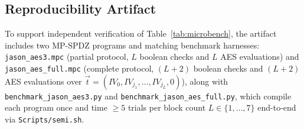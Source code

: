 \subsection{Reproducibility Artifact}
\label{sec:eval-repro}

To support independent verification of Table~\ref{tab:microbench}, the
artifact includes two MP-SPDZ programs and matching benchmark
harnesses: \texttt{jason\_aes3.mpc} (partial protocol, $L$ boolean
checks and $L$ AES evaluations) and \texttt{jason\_aes\_full.mpc}
(complete protocol, $(L+2)$ boolean checks and $(L+2)$ AES
evaluations over $\vec t = (IV_0, IV_{j_1}, \ldots, IV_{j_L}, 0)$),
along with \texttt{benchmark\_jason\_aes3.py} and
\texttt{benchmark\_jason\_aes\_full.py}, which compile each program
once and time $\geq 5$ trials per block count $L \in \{1,\ldots,7\}$
end-to-end via \texttt{Scripts/semi.sh}.
